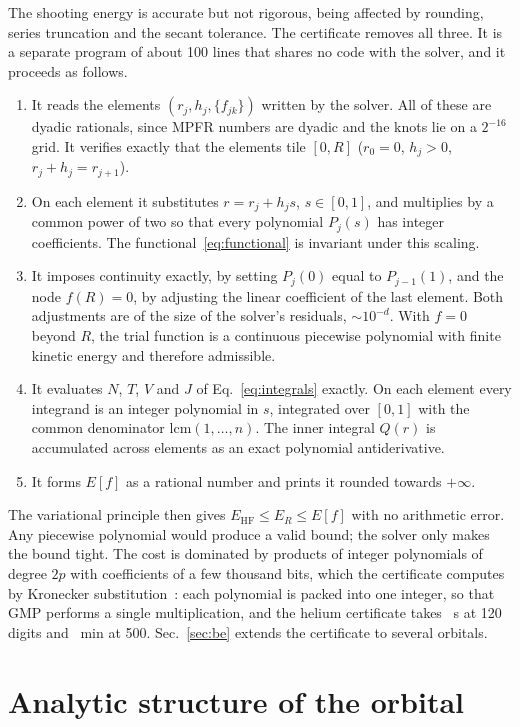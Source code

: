 \documentclass[aps,pra,reprint,superscriptaddress,amsmath,amssymb,longbibliography]{revtex4-2}
\newcommand{\EHF}{E_\mathrm{HF}}
\begin{document}
The shooting energy is accurate but not rigorous, being affected by rounding, series truncation and the secant tolerance. The certificate removes all three. It is a separate program of about 100 lines that shares no code with the solver, and it proceeds as follows.
\begin{enumerate}
\item It reads the elements $(r_j,h_j,\{f_{jk}\})$ written by the solver. All of these are dyadic rationals, since MPFR numbers are dyadic and the knots lie on a $2^{-16}$ grid. It verifies exactly that the elements tile $[0,R]$ ($r_0=0$, $h_j>0$, $r_j+h_j=r_{j+1}$).
\item On each element it substitutes $r=r_j+h_js$, $s\in[0,1]$, and multiplies by a common power of two so that every polynomial $P_j(s)$ has integer coefficients. The functional~\eqref{eq:functional} is invariant under this scaling.
\item It imposes continuity exactly, by setting $P_j(0)$ equal to $P_{j-1}(1)$, and the node $f(R)=0$, by adjusting the linear coefficient of the last element. Both adjustments are of the size of the solver's residuals, $\sim10^{-d}$. With $f=0$ beyond $R$, the trial function is a continuous piecewise polynomial with finite kinetic energy and therefore admissible.
\item It evaluates $N$, $T$, $V$ and $J$ of Eq.~\eqref{eq:integrals} exactly. On each element every integrand is an integer polynomial in $s$, integrated over $[0,1]$ with the common denominator $\mathrm{lcm}(1,\dots,n)$. The inner integral $Q(r)$ is accumulated across elements as an exact polynomial antiderivative.
\item It forms $E[f]$ as a rational number and prints it rounded towards $+\infty$.
\end{enumerate}
The variational principle then gives $\EHF\le E_R\le E[f]$ with no arithmetic error. Any piecewise polynomial would produce a valid bound; the solver only makes the bound tight. The cost is dominated by products of integer polynomials of degree $2p$ with coefficients of a few thousand bits, which the certificate computes by Kronecker substitution~\cite{vzGathen2013}: each polynomial is packed into one integer, so that GMP performs a single multiplication, and the helium certificate takes \certRunA~s at 120 digits and \certMinA~min at 500. Sec.~\ref{sec:be} extends the certificate to several orbitals.

\section{Analytic structure of the orbital}\label{sec:analytic}
\end{document}

